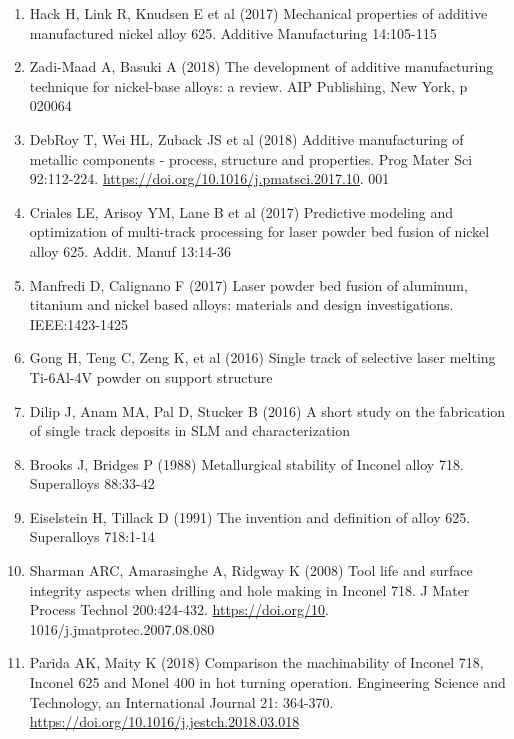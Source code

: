 \documentclass[10pt]{article}
\begin{document}
\begin{enumerate}
  \item Hack H, Link R, Knudsen E et al (2017) Mechanical properties of additive manufactured nickel alloy 625. Additive Manufacturing 14:105-115

  \item Zadi-Maad A, Basuki A (2018) The development of additive manufacturing technique for nickel-base alloys: a review. AIP Publishing, New York, p 020064

  \item DebRoy T, Wei HL, Zuback JS et al (2018) Additive manufacturing of metallic components - process, structure and properties. Prog Mater Sci 92:112-224. \href{https://doi.org/10.1016/j.pmatsci.2017.10}{https://doi.org/10.1016/j.pmatsci.2017.10}. 001

  \item Criales LE, Arisoy YM, Lane B et al (2017) Predictive modeling and optimization of multi-track processing for laser powder bed fusion of nickel alloy 625. Addit. Manuf 13:14-36

  \item Manfredi D, Calignano F (2017) Laser powder bed fusion of aluminum, titanium and nickel based alloys: materials and design investigations. IEEE:1423-1425

  \item Gong H, Teng C, Zeng K, et al (2016) Single track of selective laser melting Ti-6Al-4V powder on support structure

  \item Dilip J, Anam MA, Pal D, Stucker B (2016) A short study on the fabrication of single track deposits in SLM and characterization

  \item Brooks J, Bridges P (1988) Metallurgical stability of Inconel alloy 718. Superalloys 88:33-42

  \item Eiselstein H, Tillack D (1991) The invention and definition of alloy 625. Superalloys 718:1-14

  \item Sharman ARC, Amarasinghe A, Ridgway K (2008) Tool life and surface integrity aspects when drilling and hole making in Inconel 718. J Mater Process Technol 200:424-432. \href{https://doi.org/10}{https://doi.org/10}. 1016/j.jmatprotec.2007.08.080

  \item Parida AK, Maity K (2018) Comparison the machinability of Inconel 718, Inconel 625 and Monel 400 in hot turning operation. Engineering Science and Technology, an International Journal 21: 364-370. \href{https://doi.org/10.1016/j.jestch.2018.03.018}{https://doi.org/10.1016/j.jestch.2018.03.018}


\end{enumerate}
\end{document}
